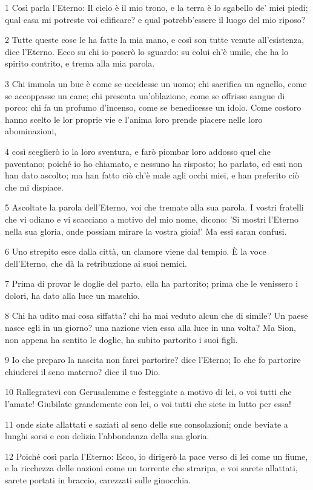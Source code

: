 \par 1 Così parla l'Eterno: Il cielo è il mio trono, e la terra è lo sgabello de' miei piedi; qual casa mi potreste voi edificare? e qual potrebb'essere il luogo del mio riposo?
\par 2 Tutte queste cose le ha fatte la mia mano, e così son tutte venute all'esistenza, dice l'Eterno. Ecco su chi io poserò lo sguardo: su colui ch'è umile, che ha lo spirito contrito, e trema alla mia parola.
\par 3 Chi immola un bue è come se uccidesse un uomo; chi sacrifica un agnello, come se accoppasse un cane; chi presenta un'oblazione, come se offrisse sangue di porco; chi fa un profumo d'incenso, come se benedicesse un idolo. Come costoro hanno scelto le lor proprie vie e l'anima loro prende piacere nelle loro abominazioni,
\par 4 così sceglierò io la loro sventura, e farò piombar loro addosso quel che paventano; poiché io ho chiamato, e nessuno ha risposto; ho parlato, ed essi non han dato ascolto; ma han fatto ciò ch'è male agli occhi miei, e han preferito ciò che mi dispiace.
\par 5 Ascoltate la parola dell'Eterno, voi che tremate alla sua parola. I vostri fratelli che vi odiano e vi scacciano a motivo del mio nome, dicono: 'Si mostri l'Eterno nella sua gloria, onde possiam mirare la vostra gioia!' Ma essi saran confusi.
\par 6 Uno strepito esce dalla città, un clamore viene dal tempio. È la voce dell'Eterno, che dà la retribuzione ai suoi nemici.
\par 7 Prima di provar le doglie del parto, ella ha partorito; prima che le venissero i dolori, ha dato alla luce un maschio.
\par 8 Chi ha udito mai cosa siffatta? chi ha mai veduto alcun che di simile? Un paese nasce egli in un giorno? una nazione vien essa alla luce in una volta? Ma Sion, non appena ha sentito le doglie, ha subito partorito i suoi figli.
\par 9 Io che preparo la nascita non farei partorire? dice l'Eterno; Io che fo partorire chiuderei il seno materno? dice il tuo Dio.
\par 10 Rallegratevi con Gerusalemme e festeggiate a motivo di lei, o voi tutti che l'amate! Giubilate grandemente con lei, o voi tutti che siete in lutto per essa!
\par 11 onde siate allattati e saziati al seno delle sue consolazioni; onde beviate a lunghi sorsi e con delizia l'abbondanza della sua gloria.
\par 12 Poiché così parla l'Eterno: Ecco, io dirigerò la pace verso di lei come un fiume, e la ricchezza delle nazioni come un torrente che straripa, e voi sarete allattati, sarete portati in braccio, carezzati sulle ginocchia.
